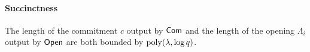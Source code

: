 \begin{definition} 
\vspace{-1ex}
\paragraph{Succinctness}
The length of the commitment $c$ output by $\mathsf{Com}$ and the length of the opening $\Lambda_i$ output by $\mathsf{Open}$ are both bounded by $\operatorname{poly}(\lambda, \log q)$.
\end{definition}


